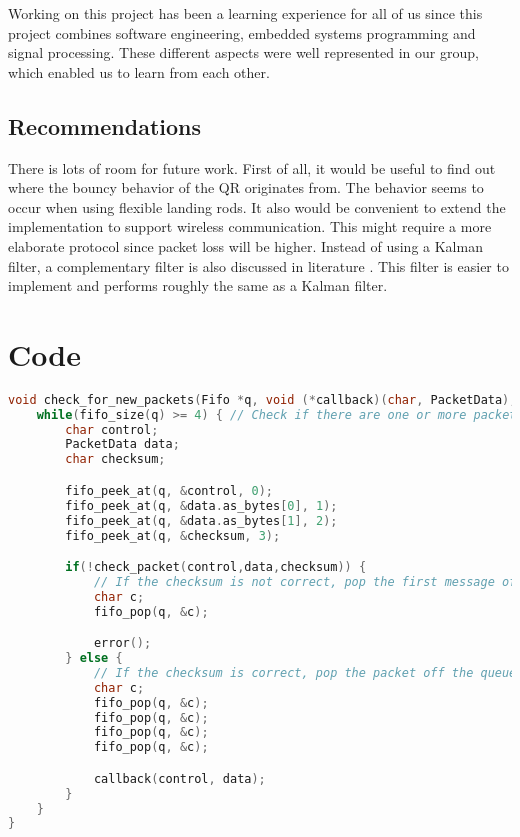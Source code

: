 \documentclass[a4paper]{article}
\begin{document}
Working on this project has been a learning experience for all of us since this project combines software engineering, embedded systems programming and signal processing. These different aspects were well represented in our group, which enabled us to learn from each other.

\subsection{Recommendations}
There is lots of room for future work. First of all, it would be useful to find out where the bouncy behavior of the QR originates from. The behavior seems to occur when using flexible landing rods. It also would be convenient to extend the implementation to support wireless communication. This might require a more elaborate protocol since packet loss will be higher. Instead of using a Kalman filter, a complementary filter is also discussed in literature \cite{higgins1975comparison}. This filter is easier to implement and performs roughly the same as a Kalman filter.

\appendix
\section{Code}
\label{code}
\begin{lstlisting}[language=C, caption=Protocol implementation]
void check_for_new_packets(Fifo *q, void (*callback)(char, PacketData), void (*error)()){
	while(fifo_size(q) >= 4) { // Check if there are one or more packets in the queue
		char control;
		PacketData data;
		char checksum;

		fifo_peek_at(q, &control, 0);
		fifo_peek_at(q, &data.as_bytes[0], 1);
		fifo_peek_at(q, &data.as_bytes[1], 2);
		fifo_peek_at(q, &checksum, 3);

		if(!check_packet(control,data,checksum)) {
			// If the checksum is not correct, pop the first message off the queue and repeat the loop
			char c;
			fifo_pop(q, &c);

			error();
		} else {
			// If the checksum is correct, pop the packet off the queue and notify a callback
			char c;
			fifo_pop(q, &c);
			fifo_pop(q, &c);
			fifo_pop(q, &c);
			fifo_pop(q, &c);

			callback(control, data);
		}
	}
}
\end{lstlisting}

 

\end{document}
